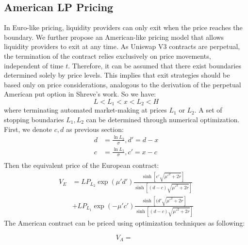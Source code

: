 \documentclass[conference]{IEEEtran}
\begin{document}
\subsection{American LP Pricing}
In Euro-like pricing, liquidity providers can only exit when the price reaches the boundary. We further propose an American-like pricing model that allows liquidity providers to exit at any time.
As Uniswap V3 contracts are perpetual, the termination of the contract relies exclusively on price movements, independent of time $t$. Therefore, it can be assumed that there exist boundaries determined solely by price levels. This implies that exit strategies should be based only on price considerations, analogous to the derivation of the perpetual American put option in Shreve's work\cite{b6}. So we have:
$$
L<L_1<x<L_2<H
$$
where terminating automated market-making at prices 
$L_1$ or $L_2$. A set of stopping boundaries $L_1, L_2$ can be determined through numerical optimization.
First, we denote $c,d$ as previous section:
$$
\begin{aligned}
d &= \frac{\ln L_2}{\sigma}, d' = d-x\\
c &= \frac{\ln L_1}{\sigma}, c' = x-c\\
\end{aligned}
$$
Then the equivalent price of the European contract:
$$
\begin{aligned}
V_E &= LP_{L_2} \exp({\mu'd'})\frac{\sinh[c'\sqrt{\mu'^2+2r}]}{\sinh[(d-c)\sqrt{\mu'^2+2r}]}\\
&+LP_{L_1}\exp({-\mu'c'})\frac{\sinh[(d'\sqrt{\mu'^2+2r}]}{\sinh[(d-c)\sqrt{\mu'^2+2r}]}    
\end{aligned} 
$$
The American contract can be priced using optimization techniques as following:

$$
V_A = \mathop{\max_{L<L_1<x<L_2<H}V_E(L_1,L_2)}
$$
\end{document}
